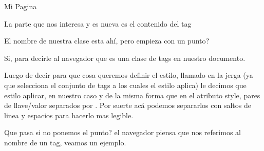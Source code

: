 \documentclass[letterpaper,10pt,spanish]{sphinxmanual}
\begin{document}
%
\begin{sphinxVerbatim}[commandchars=\\\{\}]
         
        Mi Pagina
                 
                 
\end{sphinxVerbatim}

La parte que nos interesa y es nueva es el contenido del tag

%
\begin{sphinxVerbatim}[commandchars=\\\{\}]
         
         
\end{sphinxVerbatim}

El nombre de nuestra clase esta ahí, pero empieza con un punto?

Si, para decirle al navegador que  es una clase de tags en nuestro documento.

Luego de decir para que cosa queremos definir el estilo, llamado  en
la jerga  (ya que selecciona el conjunto de tags a los cuales el estilo
aplica) le decimos que estilo aplicar, en nuestro caso y de la misma forma que
en el atributo style, pares de llave/valor separados por \sphinxstylestrong{;}. Por suerte acá
podemos separarlos con saltos de linea y espacios para hacerlo mas legible.

Que pasa si no ponemos el punto? el navegador piensa que nos referimos al
nombre de un tag, veamos un ejemplo.

%
\begin{sphinxVerbatim}[commandchars=\\\{\}]
         
         

         
         
\end{sphinxVerbatim}
\end{document}

